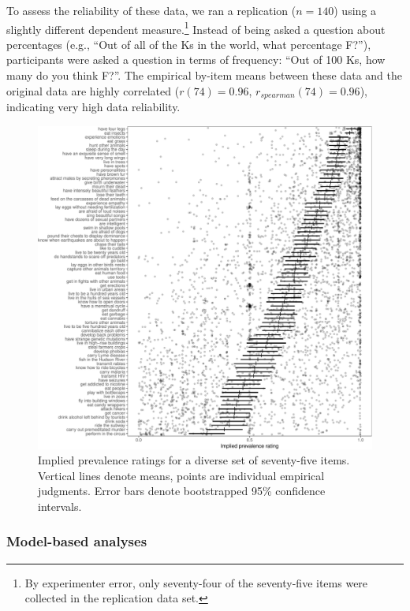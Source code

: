 \documentclass[floatsintext,doc]{apa6}
\let\rmarkdownfootnote\footnote%
\def\footnote{\protect\rmarkdownfootnote}
\begin{document}
To assess the reliability of these data, we ran a replication (\(n=140\)) using a slightly different dependent measure.\footnote{By experimenter error, only seventy-four of the seventy-five items were collected in the replication data set.}
Instead of being asked a question about percentages (e.g., \enquote{Out of all of the Ks in the world, what percentage F?}), participants were asked a question in terms of frequency: \enquote{Out of 100 Ks, how many do you think F?}.
The empirical by-item means between these data and the original data are highly correlated (\(r(74) = 0.96\), \(r_{spearman}(74)= 0.96\)), indicating very high data reliability.

\begin{figure}
\centering
\includegraphics{genint_files/figure-latex/genint-empiricalData-1.pdf}
\caption{\label{fig:genint-empiricalData}Implied prevalence ratings for a diverse set of seventy-five items. Vertical lines denote means, points are individual empirical judgments. Error bars denote bootstrapped 95\% confidence intervals.}
\end{figure}


\hypertarget{model-based-analyses}{%
\subsubsection{Model-based analyses}\label{model-based-analyses}}
\end{document}

